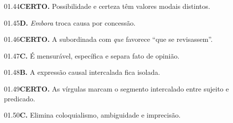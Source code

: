 \begin{solucao}{01.44}\textbf{CERTO.} Possibilidade e certeza têm valores modais distintos.\end{solucao}
\begin{solucao}{01.45}\textbf{D.} \emph{Embora} troca causa por concessão.\end{solucao}
\begin{solucao}{01.46}\textbf{CERTO.} A subordinada com \emph{que} favorece ``que se revisassem''.\end{solucao}
\begin{solucao}{01.47}\textbf{C.} É mensurável, específica e separa fato de opinião.\end{solucao}
\begin{solucao}{01.48}\textbf{B.} A expressão causal intercalada fica isolada.\end{solucao}
\begin{solucao}{01.49}\textbf{CERTO.} As vírgulas marcam o segmento intercalado entre sujeito e predicado.\end{solucao}
\begin{solucao}{01.50}\textbf{C.} Elimina coloquialismo, ambiguidade e imprecisão.\end{solucao}
